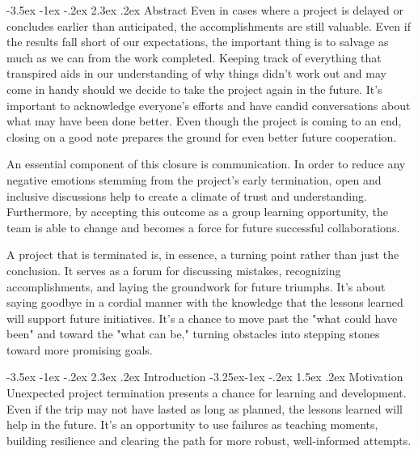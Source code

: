 \documentclass[11pt]{article}
\makeatletter
\renewcommand\section{\@startsection {section}{1}{\z@}%
                                       {-3.5ex \@plus -1ex \@minus -.2ex}%
                                       {2.3ex \@plus.2ex}%
                                       {\normalfont\fontfamily{phv}\fontsize{14}{17}\bfseries}}
\renewcommand\subsection{\@startsection{subsection}{2}{\z@}%
                                         {-3.25ex\@plus -1ex \@minus -.2ex}%
                                         {1.5ex \@plus .2ex}%
                                         {\normalfont\fontfamily{phv}\fontsize{11}{14}\bfseries}}
\makeatother
\begin{document}
{\pagebreak
\section{Abstract} 
        \hspace{1cm} Even in cases where a project is delayed or concludes earlier than anticipated, the accomplishments are still valuable. Even if the results fall short of our expectations, the important thing is to salvage as much as we can from the work completed. Keeping track of everything that transpired aids in our understanding of why things didn't work out and may come in handy should we decide to take the project again in the future. It's important to acknowledge everyone's efforts and have candid conversations about what may have been done better. Even though the project is coming to an end, closing on a good note prepares the ground for even better future cooperation.

        An essential component of this closure is communication. In order to reduce any negative emotions stemming from the project's early termination, open and inclusive discussions help to create a climate of trust and understanding. Furthermore, by accepting this outcome as a group learning opportunity, the team is able to change and becomes a force for future successful collaborations.
        
        A project that is terminated is, in essence, a turning point rather than just the conclusion. It serves as a forum for discussing mistakes, recognizing accomplishments, and laying the groundwork for future triumphs. It's about saying goodbye in a cordial manner with the knowledge that the lessons learned will support future initiatives. It's a chance to move past the "what could have been" and toward the "what can be," turning obstacles into stepping stones toward more promising goals. 
\pagebreak
\tableofcontents
\newpage
    

\section{Introduction}
        \subsection{Motivation}
            \hspace{1cm} Unexpected project termination presents a chance for learning and development. Even if the trip may not have lasted as long as planned, the lessons learned will help in the future. It's an opportunity to use failures as teaching moments, building resilience and clearing the path for more robust, well-informed attempts.
}
\end{document}
